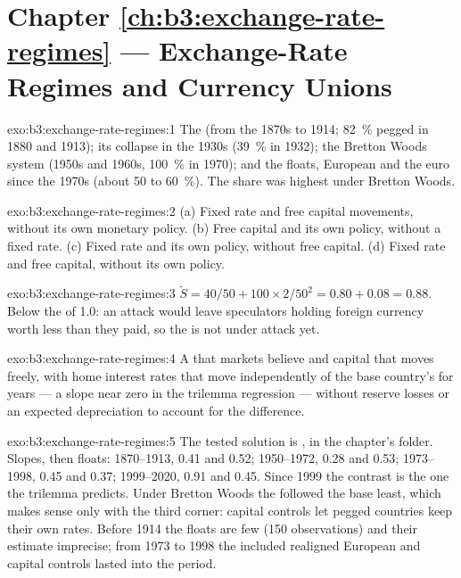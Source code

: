 \section*{Chapter \ref{ch:b3:exchange-rate-regimes} --- Exchange-Rate Regimes and Currency Unions}

\begin{solution}{exo:b3:exchange-rate-regimes:1}
The  (from the 1870s to 1914; 82~\% pegged in 1880 and 1913); its
collapse in the 1930s (39~\% in 1932); the Bretton Woods system (1950s and 1960s,
100~\% in 1970); and the floats, European  and the euro since the 1970s (about
50 to 60~\%). The share was highest under Bretton Woods. %
\end{solution}

\begin{solution}{exo:b3:exchange-rate-regimes:2}
(a) Fixed rate and free capital movements, without its own monetary policy. (b)
Free capital and its own policy, without a fixed rate. (c) Fixed rate and its own
policy, without free capital. (d) Fixed rate and free capital, without its own
policy.
\end{solution}

\begin{solution}{exo:b3:exchange-rate-regimes:3}
$\tilde S = 40/50 + 100 \times 2/50^2 = 0.80 + 0.08 = 0.88$. Below the  of 1.0: an attack would
leave speculators holding foreign currency worth less than they paid, so the 
is not under attack yet.
\end{solution}

\begin{solution}{exo:b3:exchange-rate-regimes:4}
A  that markets believe and capital that moves freely, with home interest
rates that move independently of the base country's for years --- a slope near
zero in the trilemma regression --- without reserve losses or an expected
depreciation to account for the difference.
\end{solution}

\begin{solution}{exo:b3:exchange-rate-regimes:5}
The tested solution is , in the chapter's 
folder. Slopes,  then floats: 1870--1913, 0.41 and 0.52; 1950--1972, 0.28 and 0.53;
1973--1998, 0.45 and 0.37; 1999--2020, 0.91 and 0.45. %
Since 1999 the contrast is the one the trilemma predicts. Under Bretton Woods the
 followed the base least, which makes sense only with the third corner:
capital controls let pegged countries keep their own rates. Before 1914 the floats
are few (150 observations) and their estimate imprecise; from 1973 to 1998 the 
included realigned European  and capital controls lasted into the period.
\end{solution}

